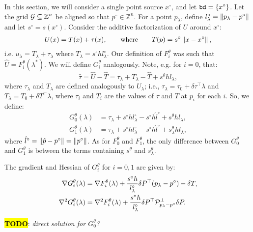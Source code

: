 \documentclass[eikonal.tex]{subfiles}
\begin{document}
In this section, we will consider a single point source $x^\circ$, and
let $\texttt{bd} = \left\{x^\circ\right\}$. Let the grid
$\mathcal{G} \subseteq \mathbb{Z}^n$ be aligned so that
$p^\circ \in \mathbb{Z}^n$. For a point $p_\lambda$, define
$l^\circ_\lambda = \left\|p_\lambda - p^\circ\right\|$ and let
$s^\circ = s(x^\circ)$. Consider the additive factorization of $U$ around $x^\circ$:
\begin{align}
  U(x) = T(x) + \tau(x), \qquad \text{where} \qquad T(p) = s^\circ \left\|x - x^\circ\right\|,
\end{align}
i.e. $u_\lambda = T_\lambda + \tau_\lambda$ where
$T_\lambda = s^\circ h l^\circ_\lambda$. Our definition of
$F_i^\theta$ was such that $\hat{U} = F_i^\theta(\lambda^*)$. We will
define $G_i^\theta$ analogously. Note, e.g. for $i = 0$, that:
\begin{equation}
  \hat{\tau} = \hat{U} - \hat{T} = \tau_\lambda + T_\lambda - \hat{T} + s^\theta h l_\lambda,
\end{equation}
where $\tau_\lambda$ and $T_\lambda$ are defined analogously to
$U_\lambda$; i.e., $\tau_\lambda = \tau_0 + \delta \tau^\top \lambda$
and $T_\lambda = T_0 + \delta T^\top \lambda$, where $\tau_i$ and
$T_i$ are the values of $\tau$ and $T$ at $p_i$ for each $i$. So, we
define:
\begin{align}
  \label{eq:Gi}
  G_0^\theta(\lambda) &= \tau_\lambda + s^\circ h l^\circ_\lambda - s^\circ h \hat{l}^\circ + s^\theta h l_\lambda, \\
  G_1^\theta(\lambda) &= \tau_\lambda + s^\circ h l^\circ_\lambda - s^\circ h \hat{l}^\circ + s^\theta_\lambda h l_\lambda,
\end{align}
where $\hat{l}^\circ = \left\|\hat{p} - p^\circ\right\| = \left\|p^\circ\right\|$. As
for $F_0^\theta$ and $F_1^\theta$, the only difference between
$G_0^\theta$ and $G_1^\theta$ is between the terms containing
$s^\theta$ and $s^\theta_\lambda$.

\begin{lemma}
  The gradient and Hessian of $G_i^\theta$ for $i = 0, 1$ are given
  by:
  \begin{align}
    \label{eq:G-grad-hess}
    \nabla G_i^\theta(\lambda) &= \nabla F_i^\theta(\lambda) + \frac{s^\circ h}{l^\circ_\lambda} \delta P^\top {(p_\lambda - p^\circ)} - \delta T, \\
    \nabla^2 G_i^\theta(\lambda) &= \nabla^2 F_i^\theta(\lambda) + \frac{s^\circ h}{l^\circ_\lambda} \delta P^\top \calP^\perp_{p_\lambda - p^\circ} \delta P.
  \end{align}
\end{lemma}

\hl{\textbf{TODO}}: \emph{direct solution for $G_0^\theta$?}
\end{document}
